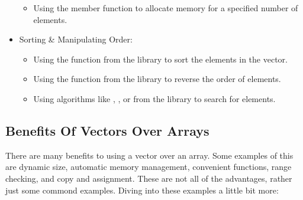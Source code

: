 \begin{itemize}
\begin{itemize}
        \item Using the  member function to allocate memory for a specified number of elements.
    \end{itemize}
    \item Sorting \& Manipulating Order:
    \begin{itemize}
        \item Using the  function from the  library to sort the elements in the vector.
        \item Using the  function from the  library to reverse the order of elements.
        \item Using algorithms like , , or  from the  library to search for elements.
    \end{itemize}
\end{itemize}

\subsection*{Benefits Of Vectors Over Arrays}

There are many benefits to using a vector over an array. Some examples of this are dynamic size, automatic memory management, convenient functions, range checking, and copy and assignment. These are
not all of the advantages, rather just some commond examples. Diving into these examples a little bit more:


